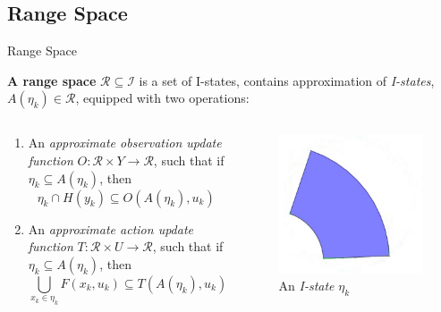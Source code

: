 \subsection[Range Space]{Range Space}
\begin{frame}{Range Space}
  \begin{definition}{\textbf{A range space}}
    $\mathcal{R} \subseteq \mathcal{I}$ is a set of I-states, contains
    approximation of \emph{I-states}, $A(\eta_k) \in \mathcal{R}$, equipped with
    two operations:
  \end{definition}
  \begin{columns}
    \begin{column}{.5\textwidth}
      \begin{enumerate}
      \item An \emph{approximate observation update function} $O: \mathcal{R} \times
        Y \to \mathcal{R}$, such that if $\eta_k \subseteq A(\eta_k)$, then
        $$\eta_k \cap H(y_k) \subseteq O(A(\eta_k), u_k)$$
      \item An \emph{approximate action update function} $T: \mathcal{R} \times U \to
        \mathcal{R}$, such that if $\eta_k \subseteq A(\eta_k)$, then
        $$\bigcup_{x_k \in \eta_k} F(x_k, u_k) \subseteq T(A(\eta_k), u_k)$$
      \end{enumerate}
    \end{column}
    \begin{column}{.4\textwidth}
    \begin{figure}
      \includegraphics[scale=0.3]{figs/norangespace.jpg}
      \caption{An \emph{I-state} $\eta_k$}
    \end{figure}
  \end{column}
\end{columns}
\end{frame}

